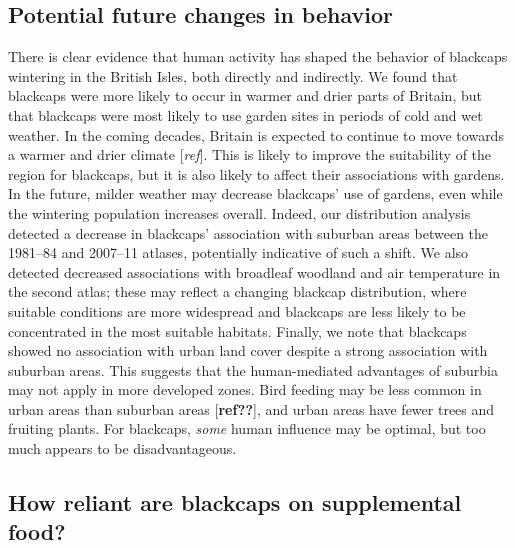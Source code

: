 \documentclass[a4paper, twoside]{templates/ociamthesis}
\begin{document}
\hypertarget{potential-future-changes-in-behavior}{%
\subsection{Potential future changes in behavior}\label{potential-future-changes-in-behavior}}

There is clear evidence that human activity has shaped the behavior of blackcaps wintering in the British Isles, both directly and indirectly. We found that blackcaps were more likely to occur in warmer and drier parts of Britain, but that blackcaps were most likely to use garden sites in periods of cold and wet weather. In the coming decades, Britain is expected to continue to move towards a warmer and drier climate {[}\emph{ref}{]}. This is likely to improve the suitability of the region for blackcaps, but it is also likely to affect their associations with gardens. In the future, milder weather may decrease blackcaps' use of gardens, even while the wintering population increases overall. Indeed, our distribution analysis detected a decrease in blackcaps' association with suburban areas between the 1981--84 and 2007--11 atlases, potentially indicative of such a shift. We also detected decreased associations with broadleaf woodland and air temperature in the second atlas; these may reflect a changing blackcap distribution, where suitable conditions are more widespread and blackcaps are less likely to be concentrated in the most suitable habitats. Finally, we note that blackcaps showed no association with urban land cover despite a strong association with suburban areas. This suggests that the human-mediated advantages of suburbia may not apply in more developed zones. Bird feeding may be less common in urban areas than suburban areas {[}\textbf{ref??}{]}, and urban areas have fewer trees and fruiting plants. For blackcaps, \emph{some} human influence may be optimal, but too much appears to be disadvantageous.

\hypertarget{how-reliant-are-blackcaps-on-supplemental-food}{%
\subsection{How reliant are blackcaps on supplemental food?}\label{how-reliant-are-blackcaps-on-supplemental-food}}
\end{document}
